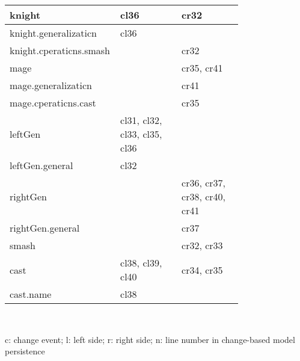 \begin{table}[ht]
\begin{scriptsize}
\begin{sffamily}
\begin{tabular}{|m{0.25\linewidth}|m{0.26\linewidth}|m{0.26\linewidth}|}
knight                             & cl36                                      & cr32                                       \\ \hline
knight.generalizaticn              & cl36                                      &                                            \\ \hline
knight.cperaticns.smash            &                                           & cr32                                       \\ \hline
mage                               &                                           & cr35, cr41                                 \\ \hline
mage.generalizaticn                &                                           & cr41                                       \\ \hline
mage.cperaticns.cast               &                                           & cr35                                       \\ \hline
leftGen                            & cl31, cl32, cl33, cl35, cl36              &                                            \\ \hline
leftGen.general                    & cl32                                      &                                            \\ \hline
rightGen                           &                                           & cr36, cr37, cr38, cr40, cr41               \\ \hline
rightGen.general                   &                                           & cr37                                       \\ \hline
smash                              &                                           & cr32, cr33                                 \\ \hline
cast                               & cl38, cl39, cl40                          & cr34, cr35                                 \\ \hline
cast.name                          & cl38                                      &                                            \\ \hline
\end{tabular}\\
\end{sffamily}
c: change event; l: left side; r: right side; n: line number in change-based model persistence
\end{scriptsize}
\end{table}

